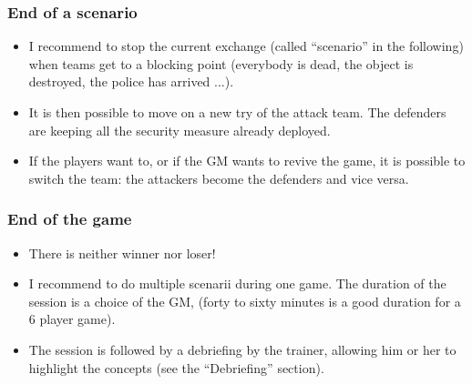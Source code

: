 \documentclass[11pt]{article} %
\begin{document}
\subsubsection{End of a scenario}
\begin{itemize}
\item I recommend to stop the current exchange (called ``scenario'' in the following) 
when teams get to a blocking point (everybody is dead, the object is destroyed, 
the police has arrived ...). 
\item It is then possible to move on a new try of the attack team. 
The defenders are keeping all the security measure already deployed. 
\item If the players want to, or if the GM wants to revive the game, it is possible to switch the team: 
the attackers become the defenders and vice versa.
\end{itemize}



\subsubsection{End of the game}
\begin{itemize}
\item There is neither winner nor loser!
\item I recommend to do multiple scenarii during one game. The duration of the session
 is a choice of the GM, (forty to sixty minutes is a good duration for a 6 player game).
\item The session is followed by a debriefing by the trainer, allowing him or her 
to highlight the concepts (see the ``Debriefing'' section).
\end{itemize}
	
\end{document}
